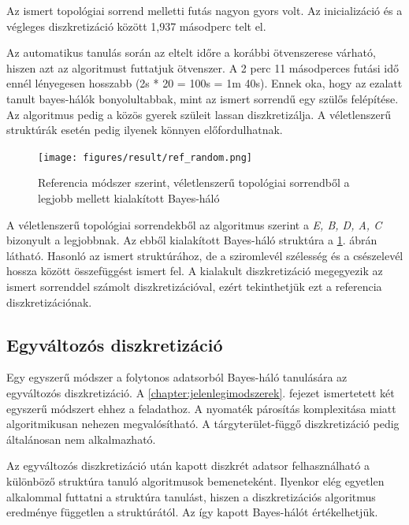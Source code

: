 Az ismert topológiai sorrend melletti futás nagyon gyors volt. Az inicializáció és a végleges diszkretizáció között 1,937 másodperc telt el.

Az automatikus tanulás során az eltelt időre a korábbi ötvenszerese várható, hiszen azt az algoritmust futtatjuk ötvenszer. A 2 perc 11 másodperces futási idő ennél lényegesen hosszabb (2s * 20 = 100s = 1m 40s). Ennek oka, hogy az ezalatt tanult bayes-hálók bonyolultabbak, mint az ismert sorrendű egy szülős felépítése. Az algoritmus pedig a közös gyerek szüleit lassan diszkretizálja. A véletlenszerű struktúrák esetén pedig ilyenek könnyen előfordulhatnak.

\begin{figure}[htp]
    \centering
    \texttt{[image: figures/result/ref\_random.png]}
    \caption{Referencia módszer szerint, véletlenszerű topológiai sorrendből a legjobb mellett kialakított Bayes-háló}
    \label{fig:eredmeny-referencia-random}
\end{figure}

A véletlenszerű topológiai sorrendekből az algoritmus szerint a \emph{E, B, D, A, C} bizonyult a legjobbnak. Az ebből kialakított Bayes-háló struktúra a \ref{fig:eredmeny-referencia-random}. ábrán látható. Hasonló az ismert struktúrához, de a sziromlevél szélesség és a csészelevél hossza között összefüggést ismert fel. A kialakult diszkretizáció megegyezik az ismert sorrenddel számolt diszkretizációval, ezért tekinthetjük ezt a referencia diszkretizációnak.

\subsection{Egyváltozós diszkretizáció}
Egy egyszerű módszer a folytonos adatsorból Bayes-háló tanulására az egyváltozós diszkretizáció. A \ref{chapter:jelenlegimodszerek}. fejezet ismertetett két egyszerű módszert ehhez a feladathoz. A nyomaték párosítás komplexitása miatt algoritmikusan nehezen megvalósítható. A tárgyterület-függő diszkretizáció pedig általánosan nem alkalmazható.

Az egyváltozós diszkretizáció után kapott diszkrét adatsor felhasználható a különböző struktúra tanuló algoritmusok bemeneteként. Ilyenkor elég egyetlen alkalommal futtatni a struktúra tanulást, hiszen a diszkretizációs algoritmus eredménye független a struktúrától. Az így kapott Bayes-hálót értékelhetjük.

